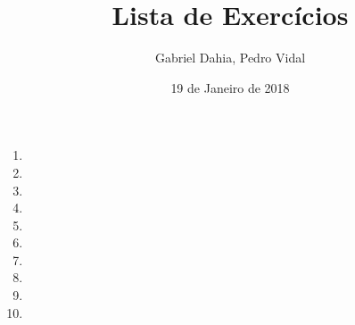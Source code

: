 \documentclass{article}
\title{Lista de Exercícios}
\author{Gabriel Dahia, Pedro Vidal}
\date{19 de Janeiro de 2018}
\begin{document}
 
\maketitle
 
\begin{enumerate}

\item

\item

\item

\item

\item

\item

\item

\item

\item

\item

\end{enumerate}
 
\end{document}
